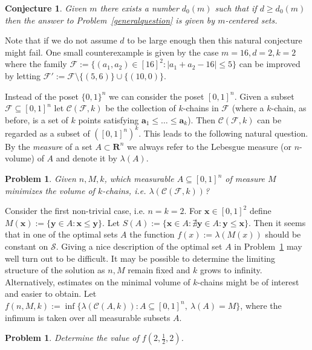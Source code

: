 \documentclass[12pt]{article}
\newtheorem{conj}[theorem]{Conjecture}
\newtheorem{proble}[theorem]{Problem}
\numberwithin{equation}{section}
\def\C{\mathcal{C}}
\def\F{\mathcal{F}}
\def\S{\mathcal{S}}
\begin{document}
\begin{conj}
Given $m$ there exists a number $d_0(m)$ such that if $d\geq d_0(m)$ then the answer to Problem~\ref{generalquestion} is given by $m$-centered sets.
\end{conj}

Note that if we do not assume $d$ to be large enough then this natural conjecture might fail. One small counterexample is given by the case $m=16, d=2, k=2$ where the family $\F:=\{(a_1,a_2)\in [16]^2 : |a_1+a_2-16|\leq 5\}$ can be improved by letting $\F' := \F \setminus \{(5,6)\} \cup \{(10,0)\}$.

Instead of the poset $\{0,1\}^n$ we can consider the poset $[0,1]^n$. Given a subset $\F\subseteq [0,1]^n$ let $\C(\F,k)$ be the collection of $k$-chains in $\F$ (where a $k$-chain, as before, is a set of $k$ points satisfying $\mathbf{a}_1\leq \ldots \leq \mathbf{a}_k$). Then $\C(\F,k)$ can be regarded as a subset of $\left([0,1]^n\right)^k$. This leads to the following natural question. By the \emph{measure} of a set $A\subset \mathbf{R}^n$ we always refer to the Lebesgue measure (or $n$-volume) of $A$ and denote it by $\lambda(A)$.

\begin{proble}\label{continuousproblem}
Given $n,M,k$, which measurable $A\subseteq [0,1]^n$ of measure $M$ minimizes the volume of $k$-chains, i.e.  $\lambda\left(\C(\F,k)\right)$?
\end{proble}

Consider the first non-trivial case, i.e. $n=k=2$. For $\mathbf{x}\in [0,1]^2$ define $M(\mathbf{x}):=\{\mathbf{y}\in A: \mathbf{x}\leq \mathbf{y}\}$. Let $S(A) := \{\mathbf{x}\in A : \nexists \mathbf{y}\in A : \mathbf{y}\leq \mathbf{x}\}$. Then it seems that in one of the optimal sets $A$ the function $f(x):=\lambda(M(x))$ should be constant on $\S$.
Giving a nice description of the optimal set $A$ in Problem~\ref{continuousproblem} may well turn out to be difficult. It may be possible to determine the limiting structure of the solution as $n,M$ remain fixed and $k$ grows to infinity. Alternatively, estimates on the minimal volume of $k$-chains might be of interest and easier to obtain. Let $f(n,M,k):=\inf\{\lambda(\C(A,k)): A\subseteq [0,1]^n,~ \lambda(A)=M\}$, where the infimum is taken over all measurable subsets $A$. 

\begin{proble}
Determine the value of $f\left(2,\frac12,2\right)$.
\end{proble}
\end{document}
